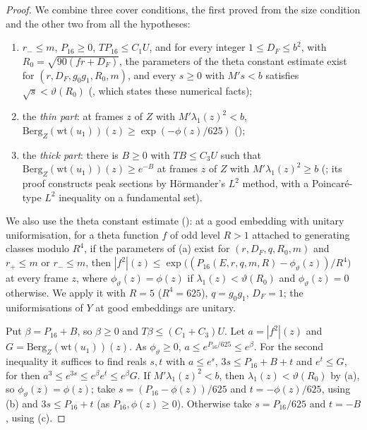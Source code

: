 \begin{proof}
We combine three cover conditions, the first proved from the size condition and the other two from
all the hypotheses:
\begin{enumerate}[label=(\alph*)]
\item $r_-\le m$, $P_{16}\ge0$, $TP_{16}\le C_1U$, and for every integer $1\le D_F\le b^2$, with
  $R_0=\sqrt{90(fr+D_F)}$, the parameters of the theta constant estimate exist for $(r,D_F,g_0g_1,R_0,m)$,
  and every $s\ge0$ with $M's<b$ satisfies $\sqrt s<\vartheta(R_0)$
  (, which states these numerical facts);
\item the \emph{thin part}: at frames $z$ of $Z$ with $M'\lambda_1(z)^2<b$,
  $\mathrm{Berg}_Z(\mathrm{wt}(u_1))(z)\ge\exp(-\phi(z)/625)$
  ();
\item the \emph{thick part}: there is $B\ge0$ with $TB\le C_3U$ such that
  $\mathrm{Berg}_Z(\mathrm{wt}(u_1))(z)\ge e^{-B}$ at frames $z$ of $Z$ with $M'\lambda_1(z)^2\ge b$
  (; its proof constructs peak sections by
  H\"ormander's $L^2$ method, with a Poincar\'e-type $L^2$ inequality on a fundamental set).
\end{enumerate}
We also use the theta constant estimate
(): at a good embedding with
unitary uniformisation, for a theta function $f$ of odd level $R>1$ attached to generating classes
modulo $R^4$, if the parameters of (a) exist for $(r,D_F,q,R_0,m)$ and $r_+\le m$ or $r_-\le m$, then
$|f^2|(z)\le\exp\bigl((P_{16}(E,r,q,m,R)-\phi_\vartheta(z))/R^4\bigr)$ at every frame $z$, where
$\phi_\vartheta(z)=\phi(z)$ if $\lambda_1(z)<\vartheta(R_0)$ and $\phi_\vartheta(z)=0$ otherwise. We apply it
with $R=5$ ($R^4=625$), $q=g_0g_1$, $D_F=1$; the uniformisations of $Y$ at good embeddings are unitary.

Put $\beta=P_{16}+B$, so $\beta\ge0$ and $T\beta\le(C_1+C_3)U$. Let $a=|f^2|(z)$ and
$G=\mathrm{Berg}_Z(\mathrm{wt}(u_1))(z)$. As $\phi_\vartheta\ge0$, $a\le e^{P_{16}/625}\le e^\beta$. For the
second inequality it suffices to find reals $s,t$ with $a\le e^s$, $3s\le P_{16}+B+t$ and $e^t\le G$, for
then $a^3\le e^{3s}\le e^{\beta}e^t\le e^\beta G$. If $M'\lambda_1(z)^2<b$, then
$\lambda_1(z)<\vartheta(R_0)$ by (a), so $\phi_\vartheta(z)=\phi(z)$; take $s=(P_{16}-\phi(z))/625$ and
$t=-\phi(z)/625$, using (b) and $3s\le P_{16}+t$ (as $P_{16},\phi(z)\ge0$). Otherwise take
$s=P_{16}/625$ and $t=-B$, using (c).
\end{proof}

